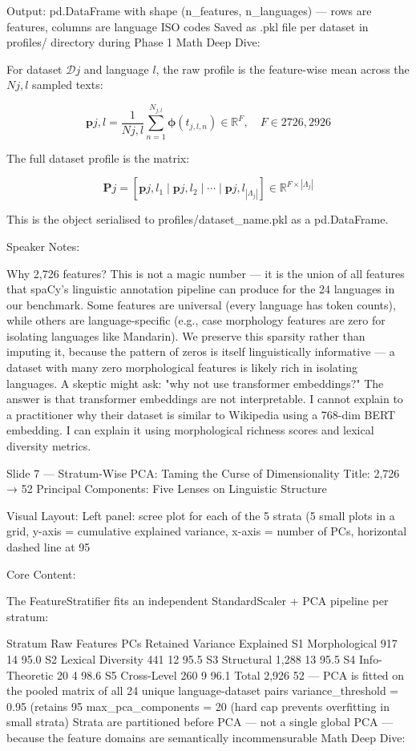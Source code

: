 Output: pd.DataFrame with shape (n_features, n_languages) — rows are features, columns are language ISO codes
Saved as .pkl file per dataset in profiles/ directory during Phase 1
Math Deep Dive:

For dataset $\mathcal{D}j$ and language $l$, the raw profile is the feature-wise mean across the $N{j,l}$ sampled texts:

$$\mathbf{p}{j,l} = \frac{1}{N{j,l}} \sum_{n=1}^{N_{j,l}} \boldsymbol{\phi}(t_{j,l,n}) \in \mathbb{R}^F, \quad F \in {2726, 2926}$$

The full dataset profile is the matrix:

$$\mathbf{P}j = \left[\mathbf{p}{j,l_1} \mid \mathbf{p}{j,l_2} \mid \cdots \mid \mathbf{p}{j,l_{|\Lambda_j|}}\right] \in \mathbb{R}^{F \times |\Lambda_j|}$$

This is the object serialised to profiles/{dataset_name}.pkl as a pd.DataFrame.

Speaker Notes:

Why 2,726 features? This is not a magic number — it is the union of all features that spaCy's linguistic annotation pipeline can produce for the 24 languages in our benchmark. Some features are universal (every language has token counts), while others are language-specific (e.g., case morphology features are zero for isolating languages like Mandarin). We preserve this sparsity rather than imputing it, because the pattern of zeros is itself linguistically informative — a dataset with many zero morphological features is likely rich in isolating languages. A skeptic might ask: "why not use transformer embeddings?" The answer is that transformer embeddings are not interpretable. I cannot explain to a practitioner why their dataset is similar to Wikipedia using a 768-dim BERT embedding. I can explain it using morphological richness scores and lexical diversity metrics.

Slide 7 — Stratum-Wise PCA: Taming the Curse of Dimensionality
Title: 2,726 → 52 Principal Components: Five Lenses on Linguistic Structure

Visual Layout: Left panel: scree plot for each of the 5 strata (5 small plots in a grid, y-axis = cumulative explained variance, x-axis = number of PCs, horizontal dashed line at 95%

Core Content:

The FeatureStratifier fits an independent StandardScaler + PCA pipeline per stratum:

Stratum	Raw Features	PCs Retained	Variance Explained
S1 Morphological	917	14	95.0%
S2 Lexical Diversity	441	12	95.5%
S3 Structural	1,288	13	95.5%
S4 Info-Theoretic	20	4	98.6%
S5 Cross-Level	260	9	96.1%
Total	2,926	52	—
PCA is fitted on the pooled matrix of all 24 unique language-dataset pairs
variance_threshold = 0.95 (retains 95%
max_pca_components = 20 (hard cap prevents overfitting in small strata)
Strata are partitioned before PCA — not a single global PCA — because the feature domains are semantically incommensurable
Math Deep Dive:

